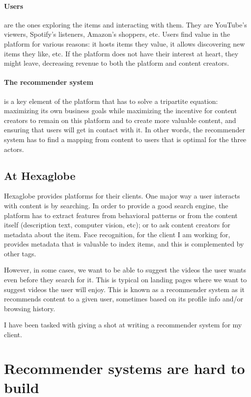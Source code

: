 \paragraph{Users} are the ones exploring the items and interacting with them. They are YouTube's viewers, Spotify's listeners, Amazon's shoppers, etc. Users find value in the platform for various reasons: it hosts items they value, it allows discovering new items they like, etc. If the platform does not have their interest at heart, they might leave, decreasing revenue to both the platform and content creators.

\paragraph{The recommender system} is a key element of the platform that has to solve a tripartite equation: maximizing its own business goals while maximizing the incentive for content creators to remain on this platform and to create more valuable content, and ensuring that users will get in contact with it. In other words, the recommender system has to find a mapping from content to users that is optimal for the three actors.

\subsection{At Hexaglobe}

Hexaglobe provides platforms for their clients. One major way a user interacts with content is by searching. In order to provide a good search engine, the platform has to extract features from behavioral patterns or from the content itself (description text, computer vision, etc); or to ask content creators for metadata about the item. Face recognition, for the client I am working for, provides metadata that is valuable to index items, and this is complemented by other tags.

However, in some cases, we want to be able to suggest the videos the user wants even before they search for it. This is typical on landing pages where we want to suggest videos the user will enjoy. This is known as a recommender system as it recommends content to a given user, sometimes based on its profile info and/or browsing history.

I have been tasked with giving a shot at writing a recommender system for my client.

\section{Recommender systems are hard to build}

